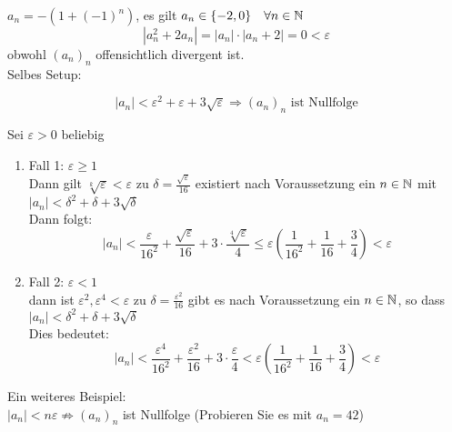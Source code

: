 \documentclass[../ana1u.tex]{subfiles}
\begin{document}
\begin{bsp}
    \(a_n = -(1 + (-1)^n)\), es gilt \(a_n \in \{-2, 0\} \quad \forall n \in \mathbb{N}\)
    \[|a_n^2 + 2a_n| = |a_n| \cdot |a_n + 2| = 0 < \varepsilon\]
    obwohl \((a_n)_n\) offensichtlich divergent ist.\\
    Selbes Setup:
    \begin{beh}
        \[|a_n| < \varepsilon^2 + \varepsilon + 3\sqrt{\varepsilon} \Rightarrow (a_n)_n \text{ ist Nullfolge}\]
    \end{beh}
    \begin{bew}
        Sei \(\varepsilon > 0\) beliebig\\
        \begin{enumerate}
            \item Fall 1: \(\varepsilon \geq 1\)\\
                Dann gilt \(\sqrt[k]{\varepsilon} < \varepsilon\) zu \(\delta = \frac{\sqrt{\varepsilon}}{16}\) existiert nach Voraussetzung ein \(n \in \mathbb{N}\) mit \(|a_n| < \delta^2 + \delta + 3\sqrt{\delta}\)\\
                Dann folgt:
                \[|a_n| < \frac{\varepsilon}{16^2} + \frac{\sqrt{\varepsilon}}{16} + 3 \cdot \frac{\sqrt[4]{\varepsilon}}{4} \leq \varepsilon\left(\frac{1}{16^2} + \frac{1}{16} + \frac{3}{4}\right) < \varepsilon\]
            \item Fall 2: \(\varepsilon < 1\)\\
                dann ist \(\varepsilon^2, \varepsilon^4 < \varepsilon\) zu \(\delta = \frac{\varepsilon^2}{16}\) gibt es nach Voraussetzung ein \(n \in \mathbb{N}\), so dass \(|a_n| < \delta^2 + \delta + 3\sqrt{\delta}\)\\
                Dies bedeutet:
                \[|a_n| < \frac{\varepsilon^4}{16^2} + \frac{\varepsilon^2}{16} + 3 \cdot \frac{\varepsilon}{4} < \varepsilon\left(\frac{1}{16^2} + \frac{1}{16} + \frac{3}{4}\right) < \varepsilon\]
        \end{enumerate}
    \end{bew}
    Ein weiteres Beispiel:\\
    \(|a_n| < n\varepsilon \not \Rightarrow (a_n)_n\) ist Nullfolge (Probieren Sie es mit \(a_n = 42\))
\end{bsp}
\end{document}
